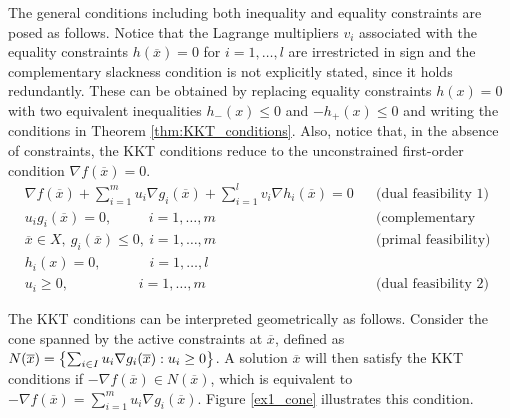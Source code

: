 The general conditions including both inequality and equality constraints are posed as follows. Notice that the Lagrange multipliers $v_i$ associated with the equality constraints $h(\overline{x}) = 0$ for $i=1, \dots,l$ are irrestricted in sign and the complementary slackness condition is not explicitly stated, since it holds redundantly. These can be obtained by replacing equality constraints $h(x) = 0$ with two equivalent inequalities $h_-(x) \leq 0$ and $-h_+(x) \leq 0$ and writing the conditions in Theorem \ref{thm:KKT_conditions}. Also, notice that, in the absence of constraints, the KKT conditions reduce to the unconstrained first-order condition $\nabla f(\overline{x}) = 0$. 
%
\begin{align*}
&\nabla f(\overline{x}) + \sum_{i=1}^m u_i \nabla g_i(\overline{x}) + \sum_{i=1}^{l} v_i \nabla h_i(\overline{x})= 0  &&\text{(dual feasibility 1)}\\ 
&u_i g_i(\overline{x}) = 0, \qquad~~\, i = 1,\dots,m &&\text{(complementary slackness)}\\
&\overline{x} \in X, \ g_i(\overline{x}) \leq 0, \ i = 1,\dots, m   &&\text{(primal feasibility)}\\
&h_i(x) = 0, \qquad\quad~~ i = 1,\dots, l\\
&u_i \geq 0, \qquad\qquad\quad i = 1, \dots, m &&\text{(dual feasibility 2)}
\end{align*}

The KKT conditions can be interpreted geometrically as follows. Consider the cone spanned by the active constraints at $\overline{x}$, defined as $N(\overline{x}) = \left\{ \sum_{i \in I}u_i \nabla g_i(\overline{x}) : u_i \geq 0 \right \}$. A solution $\overline{x}$ will then satisfy the KKT conditions if $-\nabla f(\overline{x}) \in N(\overline{x})$, which is equivalent to $- \nabla f(\overline{x}) = \sum_{i=1}^m u_i \nabla g_i(\overline{x})$. Figure \ref{ex1_cone} illustrates this condition.

